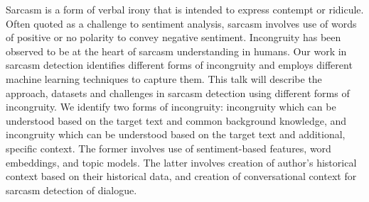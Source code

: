 Sarcasm is a form of verbal irony that is intended to express contempt or ridicule. Often quoted as a challenge to sentiment analysis, sarcasm involves use of words of positive or no polarity to convey negative sentiment. Incongruity has been observed to be at the heart of sarcasm understanding in humans. Our work in sarcasm detection identifies different forms of incongruity and employs different machine learning techniques to capture them. This talk will describe the approach, datasets and challenges in sarcasm detection using different forms of incongruity. We identify two forms of incongruity: incongruity which can be understood based on the target text and common background knowledge, and incongruity which can be understood based on the target text and additional, specific context. The former involves use of sentiment-based features, word embeddings, and topic models. The latter involves creation of author's historical context based on their historical data, and creation of conversational context for sarcasm detection of dialogue.
